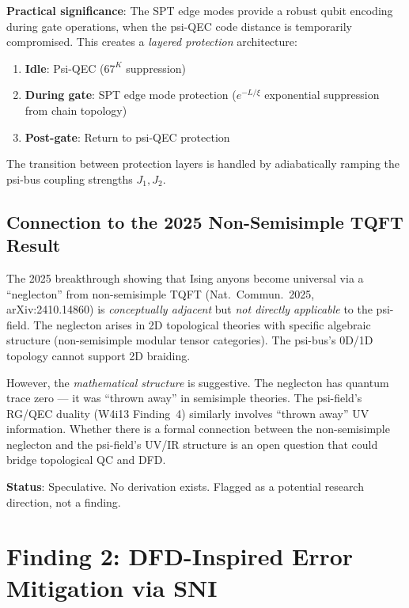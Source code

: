 \documentclass[11pt]{article}
\theoremstyle{definition}
\theoremstyle{remark}
\begin{document}
\textbf{Practical significance}: The SPT edge modes provide a robust
qubit encoding during gate operations, when the psi-QEC code distance
is temporarily compromised.  This creates a \emph{layered protection}
architecture:
\begin{enumerate}[nosep]
  \item \textbf{Idle}: Psi-QEC ($67^K$ suppression)
  \item \textbf{During gate}: SPT edge mode protection ($e^{-L/\xi}$
    exponential suppression from chain topology)
  \item \textbf{Post-gate}: Return to psi-QEC protection
\end{enumerate}

The transition between protection layers is handled by adiabatically
ramping the psi-bus coupling strengths $J_1, J_2$.

\subsection{Connection to the 2025 Non-Semisimple TQFT Result}
\label{sec:non-semisimple}

The 2025 breakthrough showing that Ising anyons become universal via
a ``neglecton'' from non-semisimple TQFT (Nat.\ Commun.\ 2025,
arXiv:2410.14860) is \emph{conceptually adjacent} but \emph{not directly
applicable} to the psi-field.  The neglecton arises in 2D topological
theories with specific algebraic structure (non-semisimple modular tensor
categories).  The psi-bus's 0D/1D topology cannot support 2D braiding.

However, the \emph{mathematical structure} is suggestive.  The neglecton
has quantum trace zero --- it was ``thrown away'' in semisimple theories.
The psi-field's RG/QEC duality (W4i13 Finding~4) similarly involves
``thrown away'' UV information.  Whether there is a formal connection
between the non-semisimple neglecton and the psi-field's UV/IR structure
is an open question that could bridge topological QC and DFD.

\textbf{Status}: Speculative.  No derivation exists.  Flagged as a
potential research direction, not a finding.

\section{Finding 2: DFD-Inspired Error Mitigation via SNI}
\label{sec:sni-mitigation}
\end{document}
